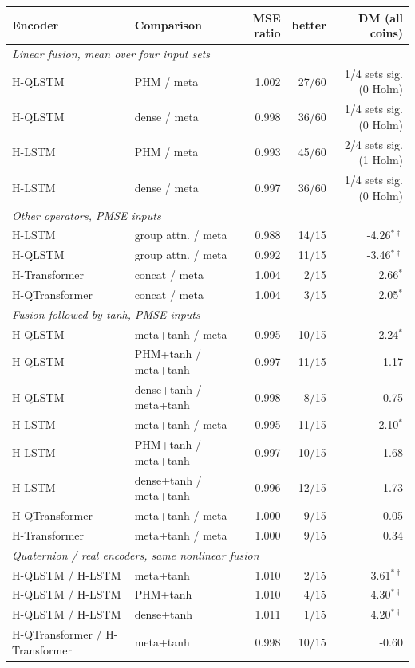 \begin{tabular}{llrrr}
\toprule
Encoder & Comparison & MSE ratio & better & DM (all coins) \\
\midrule
\multicolumn{5}{l}{\emph{Linear fusion, mean over four input sets}} \\
H-QLSTM & PHM / meta & 1.002 & 27/60 & 1/4 sets sig. (0 Holm) \\
H-QLSTM & dense / meta & 0.998 & 36/60 & 1/4 sets sig. (0 Holm) \\
H-LSTM & PHM / meta & 0.993 & 45/60 & 2/4 sets sig. (1 Holm) \\
H-LSTM & dense / meta & 0.997 & 36/60 & 1/4 sets sig. (0 Holm) \\
\midrule
\multicolumn{5}{l}{\emph{Other operators, PMSE inputs}} \\
H-LSTM & group attn. / meta & 0.988 & 14/15 & -4.26$^{*\dagger}$ \\
H-QLSTM & group attn. / meta & 0.992 & 11/15 & -3.46$^{*\dagger}$ \\
H-Transformer & concat / meta & 1.004 & 2/15 & 2.66$^{*}$ \\
H-QTransformer & concat / meta & 1.004 & 3/15 & 2.05$^{*}$ \\
\midrule
\multicolumn{5}{l}{\emph{Fusion followed by tanh, PMSE inputs}} \\
H-QLSTM & meta+tanh / meta & 0.995 & 10/15 & -2.24$^{*}$ \\
H-QLSTM & PHM+tanh / meta+tanh & 0.997 & 11/15 & -1.17 \\
H-QLSTM & dense+tanh / meta+tanh & 0.998 & 8/15 & -0.75 \\
H-LSTM & meta+tanh / meta & 0.995 & 11/15 & -2.10$^{*}$ \\
H-LSTM & PHM+tanh / meta+tanh & 0.997 & 10/15 & -1.68 \\
H-LSTM & dense+tanh / meta+tanh & 0.996 & 12/15 & -1.73 \\
H-QTransformer & meta+tanh / meta & 1.000 & 9/15 & 0.05 \\
H-Transformer & meta+tanh / meta & 1.000 & 9/15 & 0.34 \\
\midrule
\multicolumn{5}{l}{\emph{Quaternion / real encoders, same nonlinear fusion}} \\
H-QLSTM / H-LSTM & meta+tanh & 1.010 & 2/15 & 3.61$^{*\dagger}$ \\
H-QLSTM / H-LSTM & PHM+tanh & 1.010 & 4/15 & 4.30$^{*\dagger}$ \\
H-QLSTM / H-LSTM & dense+tanh & 1.011 & 1/15 & 4.20$^{*\dagger}$ \\
H-QTransformer / H-Transformer & meta+tanh & 0.998 & 10/15 & -0.60 \\
\bottomrule
\end{tabular}
